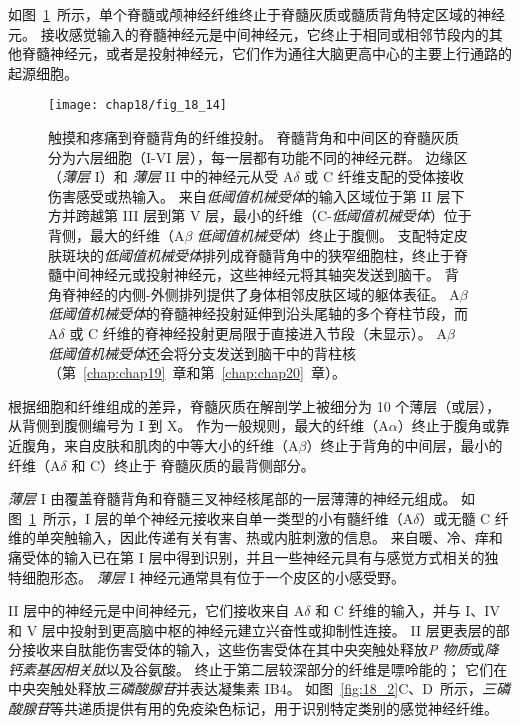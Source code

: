 如图~\ref{fig:18_14}~所示，单个脊髓或颅神经纤维终止于脊髓灰质或髓质背角特定区域的神经元。
接收感觉输入的脊髓神经元是中间神经元，它终止于相同或相邻节段内的其他脊髓神经元，或者是投射神经元，它们作为通往大脑更高中心的主要上行通路的起源细胞。


\begin{figure}[htbp]
	\centering
	\texttt{[image: chap18/fig\_18\_14]}
	\caption{触摸和疼痛到脊髓背角的纤维投射。
		脊髓背角和中间区的脊髓灰质分为六层细胞（I-VI 层），每一层都有功能不同的神经元群。
		边缘区（\textit{薄层} I）和 \textit{薄层} II 中的神经元从受 A$\delta$ 或 C 纤维支配的受体接收伤害感受或热输入。 
		来自\textit{低阈值机械受体}的输入区域位于第 II 层下方并跨越第 III 层到第 V 层，最小的纤维（C-\textit{低阈值机械受体}）位于背侧，最大的纤维（A$\beta$ \textit{低阈值机械受体}）终止于腹侧。
		支配特定皮肤斑块的\textit{低阈值机械受体}排列成脊髓背角中的狭窄细胞柱，终止于脊髓中间神经元或投射神经元，这些神经元将其轴突发送到脑干。
		背角脊神经的内侧-外侧排列提供了身体相邻皮肤区域的躯体表征。
		A$\beta$ \textit{低阈值机械受体}的脊髓神经投射延伸到沿头尾轴的多个脊柱节段，而 A$\delta$ 或 C 纤维的脊神经投射更局限于直接进入节段（未显示）。
		A$\beta$ \textit{低阈值机械受体}还会将分支发送到脑干中的背柱核（第~\ref{chap:chap19}~章和第~\ref{chap:chap20}~章）。}
	\label{fig:18_14}
\end{figure}


根据细胞和纤维组成的差异，脊髓灰质在解剖学上被细分为 10 个薄层（或层），从背侧到腹侧编号为 I 到 X。
作为一般规则，最大的纤维（A$\alpha$）终止于腹角或靠近腹角，来自皮肤和肌肉的中等大小的纤维（A$\beta$）终止于背角的中间层，最小的纤维（A$\delta$ 和 C）终止于 脊髓灰质的最背侧部分。


\textit{薄层} I 由覆盖脊髓背角和脊髓三叉神经核尾部的一层薄薄的神经元组成。
如图~\ref{fig:18_14}~所示，I 层的单个神经元接收来自单一类型的小有髓纤维（A$\delta$）或无髓 C 纤维的单突触输入，因此传递有关有害、热或内脏刺激的信息。
来自暖、冷、痒和痛受体的输入已在第 I 层中得到识别，并且一些神经元具有与感觉方式相关的独特细胞形态。
\textit{薄层} I 神经元通常具有位于一个皮区的小感受野。


II 层中的神经元是中间神经元，它们接收来自 A$\delta$ 和 C 纤维的输入，并与 I、IV 和 V 层中投射到更高脑中枢的神经元建立兴奋性或抑制性连接。
II 层更表层的部分接收来自肽能伤害受体的输入，这些伤害受体在其中央突触处释放\textit{P 物质}或\textit{降钙素基因相关肽}以及谷氨酸。
终止于第二层较深部分的纤维是嘌呤能的；
它们在中央突触处释放\textit{三磷酸腺苷}并表达凝集素 IB4。
如图~\ref{fig:18_2}C、D~所示，\textit{三磷酸腺苷}等共递质提供有用的免疫染色标记，用于识别特定类别的感觉神经纤维。


